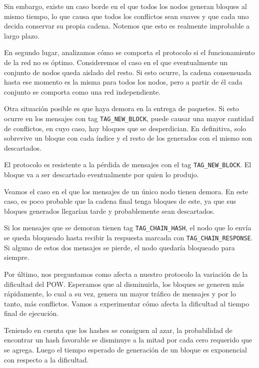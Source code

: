 Sin embargo, existe un caso borde en el que todos los nodos generan bloques al mismo tiempo, lo que causa que todos los conflictos sean suaves y que cada uno decida conservar su propia cadena. Notemos que esto es realmente improbable a largo plazo.

En segundo lugar, analizamos cómo se comporta el protocolo si el funcionamiento de la red no es óptimo. Consideremos el caso en el que eventualmente un conjunto de nodos queda aislado del resto. Si esto ocurre, la cadena consensuada hasta ese momento es la misma para todos los nodos, pero a partir de él cada conjunto se comporta como una red independiente. 

Otra situación posible es que haya demora en la entrega de paquetes. Si esto ocurre en los mensajes con tag \texttt{TAG\_NEW\_BLOCK}, puede causar una mayor cantidad de conflictos, en cuyo caso, hay bloques que se desperdician. En definitiva, solo sobrevive un bloque con cada índice y el resto de los generados con el mismo son descartados. 

El protocolo es resistente a la pérdida de mensajes con el tag \texttt{TAG\_NEW\_BLOCK}. El bloque va a ser descartado eventualmente por quien lo produjo.

Veamos el caso en el que los mensajes de un único nodo tienen demora. En este caso, es poco probable que la cadena final tenga bloques de este, ya que sus bloques generados llegarían tarde y probablemente sean descartados.

Si los mensajes que se demoran tienen tag \texttt{TAG\_CHAIN\_HASH}, el nodo que lo envía se queda bloqueado hasta recibir la respuesta marcada con \texttt{TAG\_CHAIN\_RESPONSE}. Si alguno de estos dos mensajes se pierde, el nodo quedaría bloqueado para siempre.


Por último, nos preguntamos como afecta a nuestro protocolo la variación de la dificultad del POW. Esperamos que al disminuirla, los bloques se generen más rápidamente, lo cual a su vez, genera un mayor tráfico de mensajes y por lo tanto, más conflictos. Vamos a experimentar cómo afecta la dificultad al tiempo final de ejecución.

Teniendo en cuenta que los hashes se consiguen al azar, la probabilidad de encontrar un hash favorable se disminuye a la mitad por cada cero requerido que se agrega. Luego el tiempo esperado de generación de un bloque es exponencial con respecto a la dificultad.











